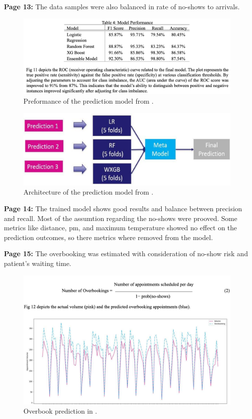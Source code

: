     \textbf{Page 13:}
    The data samples were also balanced in rate of no-shows to arrivals.
    \begin{figure}[H]
        \centering
        \includegraphics[width=1\textwidth]{figures/0006_SM01US23/fig4.png}
        \caption{Preformance of the prediction model from \cite{x147}.}
        \label{fig4:0006_SM01US23}
    \end{figure}
    \begin{figure}[H]
        \centering
        \includegraphics[width=.8\textwidth]{figures/0006_SM01US23/fig3.png}
        \caption{Architecture of the prediction model from \cite{x147}.}
        \label{fig3:0006_SM01US23}
    \end{figure}
    
    
    \textbf{Page 14:}
    The trained model shows good results and balance between precision and recall. Most of the assumtion regarding the no-shows were prooved. Some metrics like distance, pm, and maximum temperature showed no effect on the prediction outcomes, so there metrics where removed from the model.

    \textbf{Page 15:}
    The overbooking was estimated with consideration of no-show risk and patient's waiting time.
    \begin{figure}[H]
        \centering
        \includegraphics[width=.8\textwidth]{figures/0006_SM01US23/fig5.png}
        \caption{Overbook prediction in \cite{x147}.}
        \label{fig5:0006_SM01US23}
    \end{figure}

